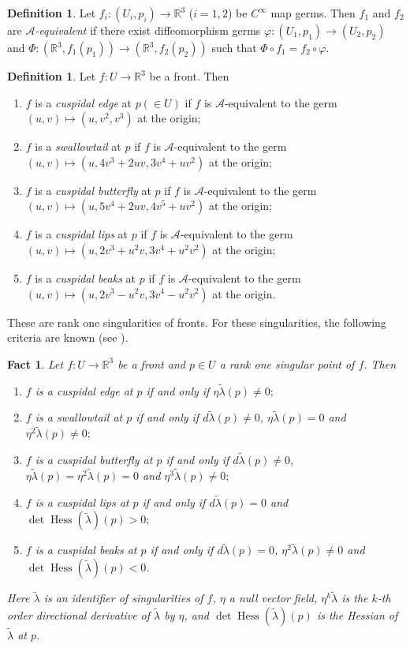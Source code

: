 \documentclass[11pt,a4paper,pdflatex,final]{amsart}
\theoremstyle{plain}
\newtheorem{fact}[theorem]{Fact}%
\theoremstyle{definition}
\newtheorem{definition}[theorem]{Definition}%
\theoremstyle{remark}
\newcommand{\hess}{\operatorname{Hess}}
\newcommand{\0}{\bm{0}}
\newcommand{\R}{\mathbb{R}}
\newcommand{\mcal}{\mathcal}
\renewcommand{\phi}{\varphi}
\newcommand{\til}{\tilde}
\numberwithin{equation}{section}
\begin{document}
\begin{definition}
Let $f_i\colon(U_i,p_i)\to\R^3$ ($i=1,2$) be $C^\infty$ map germs. 
Then $f_1$ and $f_2$ are \textit{$\mcal{A}$-equivalent} 
if there exist diffeomorphism germs $\phi\colon(U_1,p_1)\to(U_2,p_2)$ 
and $\Phi\colon(\R^3,f_1(p_1))\to(\R^3,f_2(p_2))$ such that 
\(
\Phi\circ f_1=f_2\circ \phi
\).
\end{definition}
\begin{definition}\label{dfn:singularities}
Let $f\colon U\to\R^3$ be a front. 
Then 
\begin{enumerate}[label={\rm(\arabic*)}]
	\item $f$ is a \textit{cuspidal edge} at $p(\in U)$ 
	if $f$ is $\mcal{A}$-equivalent to the germ $(u,v)\mapsto(u,v^2,v^3)$ at the origin;
	\item $f$ is a \textit{swallowtail} at $p$ 
	if $f$ is $\mcal{A}$-equivalent to the germ 
	$(u,v)\mapsto(u,4v^3+2uv,3v^4+uv^2)$ at the origin;
	\item $f$ is a \textit{cuspidal butterfly} at $p$ 
	if $f$ is $\mcal{A}$-equivalent to the germ 
	$(u,v)\mapsto(u,5v^4+2uv,4v^5+uv^2)$ at the origin;
	\item $f$ is a \textit{cuspidal lips} at $p$ 
	if $f$ is $\mcal{A}$-equivalent to the germ 
	$(u,v)\mapsto(u,2v^3+u^2v,3v^4+u^2v^2)$ at the origin;
	\item $f$ is a \textit{cuspidal beaks} at $p$ 
	if $f$ is $\mcal{A}$-equivalent to the germ 
	$(u,v)\mapsto(u,2v^3-u^2v,3v^4-u^2v^2)$ at the origin.
\end{enumerate}
\end{definition}
These are rank one singularities of fronts. 
For these singularities, the following criteria are known 
(see \cite{krsuy,is-mandala,ist-horo,suy-ak,usy-book}). 
\begin{fact}\label{fact:crit}
Let $f\colon U\to\R^3$ be a front and $p\in U$ a rank one singular point of $f$. 
Then 
\begin{enumerate}[label={\rm(\arabic*)}]
	\item $f$ is a cuspidal edge at $p$ 
	if and only if $\eta\til{\lambda}(p)\neq0;$
	\item $f$ is a swallowtail at $p$ 
	if and only if $d\til{\lambda}(p)\neq0$, 
	$\eta\til{\lambda}(p)=0$ and $\eta^2\til{\lambda}(p)\neq0;$
	\item $f$ is a cuspidal butterfly at $p$ 
	if and only if $d\til{\lambda}(p)\neq0$, 
	$\eta\til{\lambda}(p)=\eta^2\til{\lambda}(p)=0$ 
	and $\eta^3\til{\lambda}(p)\neq0;$
	\item $f$ is a cuspidal lips at $p$ 
	if and only if $d\til{\lambda}(p)=0$ and $\det\hess(\til{\lambda})(p)>0;$
	\item $f$ is a cuspidal beaks at $p$ 
	if and only if $d\til{\lambda}(p)=0$, $\eta^2\til{\lambda}(p)\neq0$ and 
	$\det\hess(\til{\lambda})(p)<0$.
\end{enumerate}
Here $\til{\lambda}$ is an identifier of singularities of $f$, 
$\eta$ a null vector field, $\eta^k\til{\lambda}$ is 
the $k$-th order directional derivative of $\til{\lambda}$ 
by $\eta$, and $\det\hess(\til{\lambda})(p)$ is the Hessian of $\til{\lambda}$ at $p$. 
\end{fact}
\end{document}
